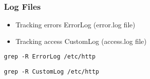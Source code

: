 \begin{frame}[fragile]
        \frametitle{Log Files}
\begin{itemize}
    \item Tracking errors ErrorLog (error.log file)
    \item Tracking access CustomLog (access.log file)
\end{itemize}

\verb|grep -R ErrorLog /etc/http|

\verb|grep -R CustomLog /etc/http|

\end{frame}
